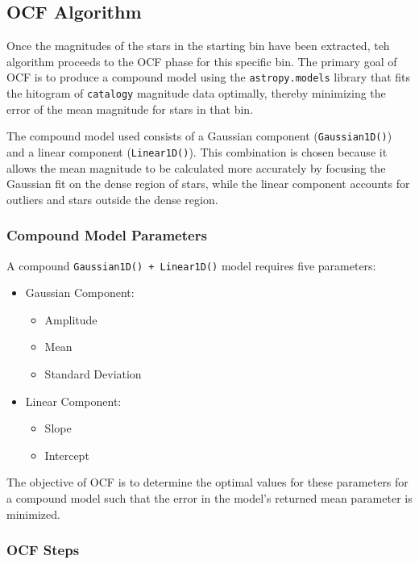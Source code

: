 \documentclass[svgnames]{article}     %
\begin{document}
\subsection{OCF Algorithm} 

Once the magnitudes of the stars in the starting bin have been extracted, teh
algorithm proceeds to the OCF phase for this specific bin. The primary goal of
OCF is to produce a compound model using the \verb|astropy.models| library that
fits the hitogram of \verb|catalogy| magnitude data optimally, thereby
minimizing the error of the mean magnitude for stars in that bin. 

The compound model used consists of a Gaussian component (\verb|Gaussian1D()|)
and a linear component (\verb|Linear1D()|). This combination is chosen because
it allows the mean magnitude to be calculated more accurately by focusing the
Gaussian fit on the dense region of stars, while the linear component accounts
for outliers and stars outside the dense region. 

\subsubsection{Compound Model Parameters} 

A compound \verb|Gaussian1D() + Linear1D()| model requires five parameters: 

\begin{itemize}
  \item[1.] Gaussian Component: 
    \begin{itemize}
      \item[-] Amplitude
        \item[-] Mean 
          \item[-] Standard Deviation
    \end{itemize}
  \item[2.] Linear Component: 
    \begin{itemize}
      \item[-] Slope
        \item[-] Intercept
    \end{itemize}
\end{itemize}

The objective of OCF is to determine the optimal values for these parameters
for a compound model such that the error in the model's returned mean parameter
is minimized.

\subsubsection{OCF Steps}
\end{document}
